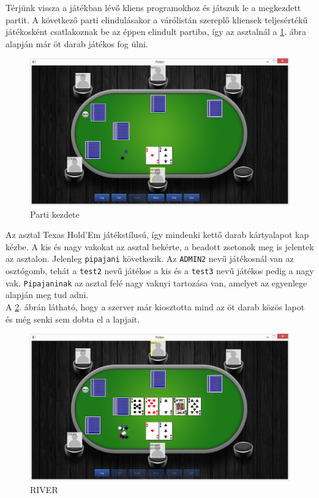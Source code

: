 Térjünk vissza a játékban lévő kliens programokhoz és játszuk le a megkezdett partit. A következő parti elindulásakor a várólistán szereplő kliensek teljesértékű játékosként csatlakoznak be az éppen elindult partiba, így az asztalnál a \ref{fig:parti_2}. ábra alapján már öt darab játékos fog ülni.
 \begin{figure}[h!]
  \caption{Parti kezdete}
  \label{fig:parti_2}
  \centering
    \includegraphics[width=\linewidth]{user-documentation/images/parti/parti_2.jpg}
\end{figure}
Az asztal Texas Hold'Em játékstílusú, így mindenki kettő darab kártyalapot kap kézbe. A kis és nagy vakokat az asztal bekérte, a beadott zsetonok meg is jelentek az asztalon. Jelenleg \texttt{pipajani} következik. Az \texttt{ADMIN2} nevű játékosnál van az osztógomb, tehát a \texttt{test2} nevű játékos a kis és a \texttt{test3} nevű játékos pedig a nagy vak. \texttt{Pipajaninak} az asztal felé nagy vaknyi tartozása van, amelyet az egyenlege alapján meg tud adni. \\
A \ref{fig:parti_3}. ábrán látható, hogy a szerver már kiosztotta mind az öt darab közös lapot és még senki sem dobta el a lapjait.
 \begin{figure}[h!]
  \caption{RIVER}
  \label{fig:parti_3}
  \centering
    \includegraphics[width=\linewidth]{user-documentation/images/parti/parti_3.jpg}
\end{figure}
